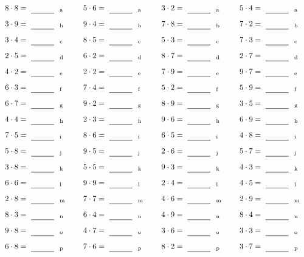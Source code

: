 \documentclass
[
  draft    = true,
  fontsize = 11pt,
  parskip  = half-
]
{scrartcl}
\begin{document}
\par\vfill\par
\begin{align*}
    \pline{8\cdot8}&=\rline{a}
  & \pline{5\cdot6}&=\rline{a}
  & \pline{3\cdot2}&=\rline{a}
  & \pline{5\cdot4}&=\rline{a} \\[1ex]
    \pline{3\cdot9}&=\rline{b}
  & \pline{9\cdot4}&=\rline{b}
  & \pline{7\cdot8}&=\rline{b}
  & \pline{7\cdot2}&=\rline{b} \\[1ex]
    \pline{3\cdot4}&=\rline{c}
  & \pline{8\cdot5}&=\rline{c}
  & \pline{5\cdot3}&=\rline{c}
  & \pline{7\cdot3}&=\rline{c} \\[1ex]
    \pline{2\cdot5}&=\rline{d}
  & \pline{6\cdot2}&=\rline{d}
  & \pline{8\cdot7}&=\rline{d}
  & \pline{2\cdot7}&=\rline{d} \\[1ex]
    \pline{4\cdot2}&=\rline{e}
  & \pline{2\cdot2}&=\rline{e}
  & \pline{7\cdot9}&=\rline{e}
  & \pline{9\cdot7}&=\rline{e} \\[1ex]
    \pline{6\cdot3}&=\rline{f}
  & \pline{7\cdot4}&=\rline{f}
  & \pline{5\cdot2}&=\rline{f}
  & \pline{5\cdot9}&=\rline{f} \\[1ex]
    \pline{6\cdot7}&=\rline{g}
  & \pline{9\cdot2}&=\rline{g}
  & \pline{8\cdot9}&=\rline{g}
  & \pline{3\cdot5}&=\rline{g} \\[1ex]
    \pline{4\cdot4}&=\rline{h}
  & \pline{2\cdot3}&=\rline{h}
  & \pline{9\cdot6}&=\rline{h}
  & \pline{6\cdot9}&=\rline{h} \\[1ex]
    \pline{7\cdot5}&=\rline{i}
  & \pline{8\cdot6}&=\rline{i}
  & \pline{6\cdot5}&=\rline{i}
  & \pline{4\cdot8}&=\rline{i} \\[1ex]
    \pline{5\cdot8}&=\rline{j}
  & \pline{9\cdot5}&=\rline{j}
  & \pline{2\cdot6}&=\rline{j}
  & \pline{5\cdot7}&=\rline{j} \\[1ex]
    \pline{3\cdot8}&=\rline{k}
  & \pline{5\cdot5}&=\rline{k}
  & \pline{9\cdot3}&=\rline{k}
  & \pline{4\cdot3}&=\rline{k} \\[1ex]
    \pline{6\cdot6}&=\rline{l}
  & \pline{9\cdot9}&=\rline{l}
  & \pline{2\cdot4}&=\rline{l}
  & \pline{4\cdot5}&=\rline{l} \\[1ex]
    \pline{2\cdot8}&=\rline{m}
  & \pline{7\cdot7}&=\rline{m}
  & \pline{4\cdot6}&=\rline{m}
  & \pline{2\cdot9}&=\rline{m} \\[1ex]
    \pline{8\cdot3}&=\rline{n}
  & \pline{6\cdot4}&=\rline{n}
  & \pline{4\cdot9}&=\rline{n}
  & \pline{8\cdot4}&=\rline{n} \\[1ex]
    \pline{9\cdot8}&=\rline{o}
  & \pline{4\cdot7}&=\rline{o}
  & \pline{3\cdot6}&=\rline{o}
  & \pline{3\cdot3}&=\rline{o} \\[1ex]
    \pline{6\cdot8}&=\rline{p}
  & \pline{7\cdot6}&=\rline{p}
  & \pline{8\cdot2}&=\rline{p}
  & \pline{3\cdot7}&=\rline{p}
\end{align*}
\end{document}
